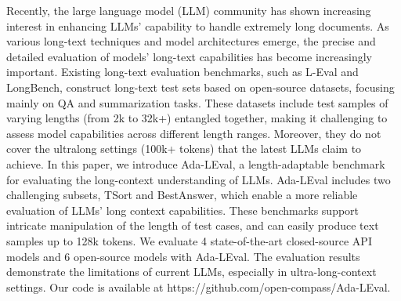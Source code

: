 Recently, the large language model (LLM) community has shown increasing interest in enhancing LLMs' capability to handle extremely long documents. As various long-text techniques and model architectures emerge, the precise and detailed evaluation of models' long-text capabilities has become increasingly important. Existing long-text evaluation benchmarks, such as L-Eval and LongBench, construct long-text test sets based on open-source datasets, focusing mainly on QA and summarization tasks. These datasets include test samples of varying lengths (from 2k to 32k+) entangled together, making it challenging to assess model capabilities across different length ranges.  Moreover, they do not cover the ultralong settings (100k+ tokens) that the latest LLMs claim to achieve. In this paper, we introduce Ada-LEval, a length-adaptable benchmark for evaluating the long-context understanding of LLMs. Ada-LEval includes two challenging subsets, TSort and BestAnswer, which enable a more reliable evaluation of LLMs' long context capabilities. These benchmarks support intricate manipulation of the length of test cases, and can easily produce text samples up to 128k tokens. We evaluate 4 state-of-the-art closed-source API models and 6 open-source models with Ada-LEval. The evaluation results demonstrate the limitations of current LLMs, especially in ultra-long-context settings. Our code is available at https://github.com/open-compass/Ada-LEval.